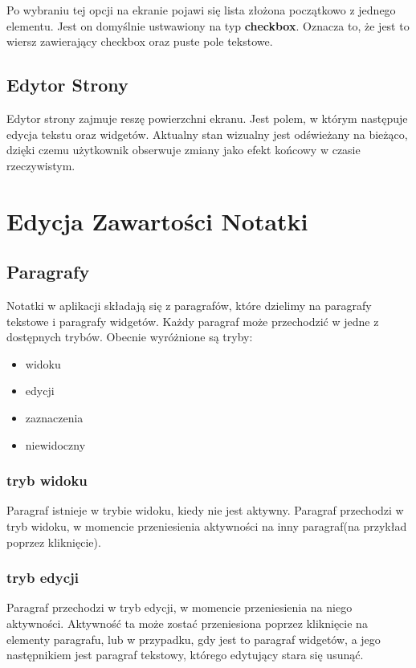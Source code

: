 \documentclass[shortabstract]{iithesis}
\begin{document}
Po wybraniu tej opcji na ekranie pojawi się lista złożona początkowo z jednego elementu.
Jest on domyślnie ustwawiony na typ \textbf{checkbox}. Oznacza to, że jest to wiersz zawierający checkbox oraz puste pole tekstowe.

\subsection{Edytor Strony}

Edytor strony zajmuje reszę powierzchni ekranu. Jest polem, w którym następuje edycja tekstu oraz widgetów. Aktualny stan wizualny jest odświeżany na bieżąco, dzięki czemu użytkownik obserwuje zmiany jako efekt końcowy w czasie rzeczywistym.



\section{Edycja Zawartości Notatki}

\subsection{Paragrafy}

Notatki w aplikacji składają się z paragrafów, które dzielimy na paragrafy tekstowe i paragrafy widgetów.
Każdy paragraf może przechodzić w jedne z dostępnych trybów.
Obecnie wyróżnione są tryby:

\begin{itemize}
    \item widoku
    \item edycji
    \item zaznaczenia
    \item niewidoczny
\end{itemize}

\subsubsection{tryb widoku}

Paragraf istnieje w trybie widoku, kiedy nie jest aktywny.
Paragraf przechodzi w tryb widoku, w momencie przeniesienia aktywności na inny paragraf(na przykład poprzez kliknięcie).

\subsubsection{tryb edycji}

Paragraf przechodzi w tryb edycji, w momencie przeniesienia na niego aktywności.
Aktywność ta może zostać przeniesiona poprzez kliknięcie na elementy paragrafu, lub w przypadku, gdy jest to paragraf widgetów, a jego następnikiem jest paragraf tekstowy, którego edytujący stara się usunąć.
\end{document}
